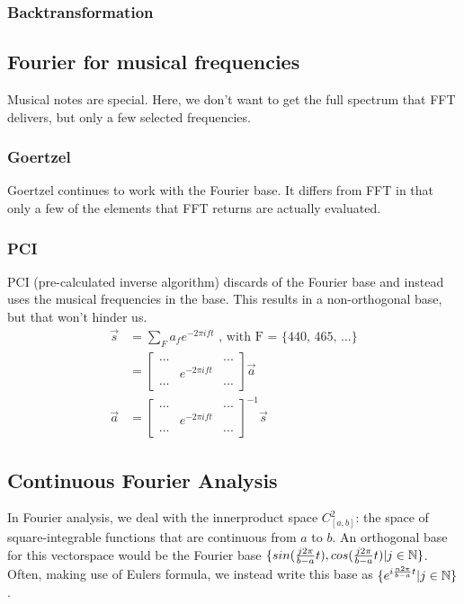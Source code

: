 \subsubsection{Backtransformation}

\subsection{Fourier for musical frequencies}
Musical notes are special. Here, we don't want to get the full spectrum that FFT delivers, but only a few selected frequencies. 
\subsubsection{Goertzel}
Goertzel continues to work with the Fourier base. It differs from FFT in that only a few of the elements that FFT returns are actually evaluated. 
\subsubsection{PCI}
PCI (pre-calculated inverse algorithm) discards of the Fourier base and instead uses the musical frequencies in the base. This results in a non-orthogonal base, but that won't hinder us. 
\begin{equation}
    \begin{split}
        \vec{s} &= \sum_F a_f e^{-2 \pi i f t} \text{  , with F = \{440, 465, ...\}}  \\
                &= \begin{bmatrix}  ... & & ... \\ & e^{- 2 \pi i f t} & \\ ... &  & ... \end{bmatrix} \vec{a} \\
        \vec{a} &= \begin{bmatrix}  ... & & ... \\ & e^{- 2 \pi i f t} & \\ ... &  & ... \end{bmatrix}^{-1} \vec{s}
    \end{split}
\end{equation}

\subsection{Continuous Fourier Analysis}

In Fourier analysis, we deal with the innerproduct space $C_{[a,b]}^2$: the space of square-integrable functions that are continuous from $a$ to $b$. An orthogonal base for this vectorspace would be the Fourier base $\{ sin(\frac{j 2 \pi}{b-a} t), cos(\frac{j 2 \pi}{b-a}  t) | j \in \mathbb{N} \}$. Often, making use of Eulers formula, we instead write this base as $\{ e^{i \frac{n 2 \pi}{b-a} t} | j \in \mathbb{N} \}$. 

